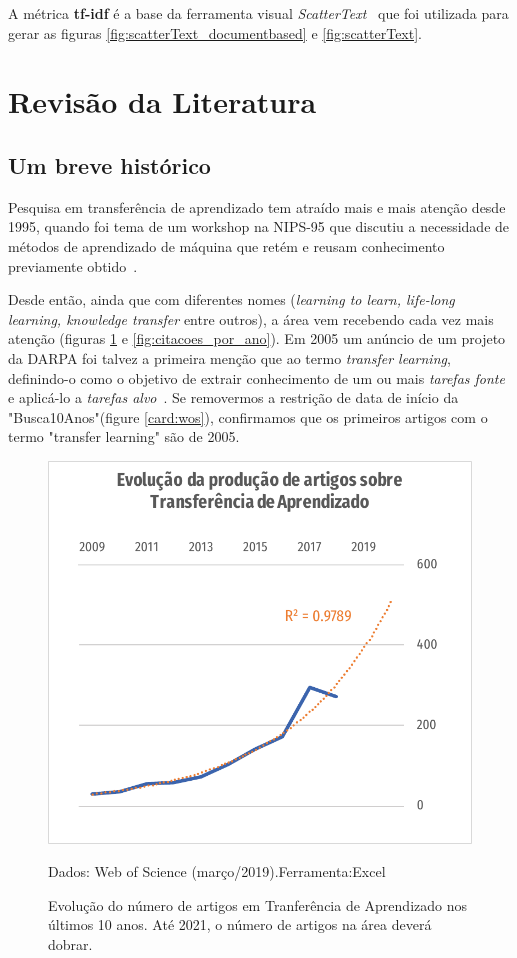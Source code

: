 \documentclass[sigconf]{acmart}
\newcommand{\source}[2]{\raggedleft{}\vspace*{-7mm}\caption*{ \textmd{\scriptsize{Dados: {#1}.\hfill Ferramenta:{#2}}}}}
\begin{document}
\begin{enumerate}[a)]
{  A métrica \textbf{tf-idf} é a base da ferramenta visual \emph{ScatterText}~\cite{kessler2017scattertext} que foi utilizada para gerar as figuras \ref{fig:scatterText_documentbased} e \ref{fig:scatterText}.

  }\label{analiseTextual}
\end{enumerate}



\section{Revisão da Literatura}
  \subsection{Um breve histórico}
  Pesquisa em transferência de aprendizado tem atraído mais e mais atenção desde 1995, quando foi tema de  um workshop na NIPS-95 que discutiu a necessidade de métodos de aprendizado de máquina que retém e reusam conhecimento previamente obtido~\cite{PanYang}. 
  
  Desde então, ainda que com diferentes nomes (\emph{learning to learn, life-long learning, knowledge transfer} entre outros), a área vem recebendo cada vez mais atenção (figuras \ref{fig:artigos_por_ano} e \ref{fig:citacoes_por_ano}). Em 2005 um anúncio de um projeto da DARPA foi talvez a primeira menção que ao termo \emph{transfer learning}, definindo-o como o objetivo de extrair conhecimento de um ou mais \emph{tarefas fonte} e aplicá-lo a \emph{tarefas alvo}~\cite{PanYang}. Se removermos a restrição de data de início da "Busca10Anos"(figure \ref{card:wos}), confirmamos que os primeiros artigos com o termo "transfer learning" são de 2005.

  \begin{figure}[h]
    \includegraphics[width=\columnwidth]{artigos_por_ano}
    \source{Web of Science (março/2019)}{Excel}
    \caption{Evolução do número de artigos em Tranferência de Aprendizado nos últimos 10 anos. Até 2021, o número de artigos na área deverá dobrar.}
    \label{fig:artigos_por_ano}
  \end{figure}
\end{document}
